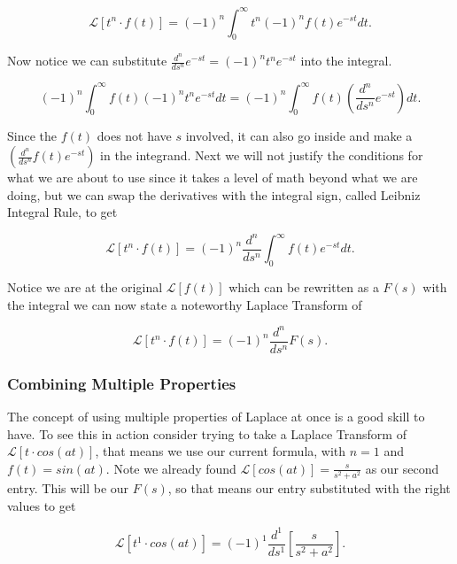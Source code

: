 \documentclass[12pt]{article}
\newcommand{\lp}{\mathscr{L}}
\begin{document}
\begin{equation*}
    \lp[t^n \cdot f(t)]=(-1)^n \int_0^{\infty} t^n (-1)^nf(t) e^{-st} dt.
\end{equation*}

Now notice we can substitute $\frac{d^n}{ds^n}e^{-st}=(-1)^n t^n e^{-st}$ into the integral. 

\begin{equation*}
    (-1)^n \int_0^{\infty} f(t)(-1)^nt^n e^{-st} dt=(-1)^n \int_0^{\infty} f(t) \left(\frac{d^n}{ds^n}e^{-st}\right) dt.
\end{equation*}

Since the $f(t)$ does not have $s$ involved, it can also go inside and make a $ \left(\frac{d^n}{ds^n}f(t)e^{-st}\right)$ in the integrand. Next we will not justify the conditions for what we are about to use since it takes a level of math beyond what we are doing, but we can swap the derivatives with the integral sign, called Leibniz Integral Rule, to get

\begin{equation*}
    \lp[t^n \cdot f(t)]=(-1)^n \frac{d^n}{ds^n}\int_0^{\infty} f(t) e^{-st} dt.
\end{equation*}

Notice we are at the original $\lp[f(t)]$ which can be rewritten as a $F(s)$ with the integral we can now state a noteworthy Laplace Transform of

\begin{equation*}
    \lp[t^n \cdot f(t)]=(-1)^n \frac{d^n}{ds^n}F(s).
\end{equation*}

\subsubsection{Combining Multiple Properties}

The concept of using multiple properties of Laplace at once is a good skill to have. To see this in action consider trying to take a Laplace Transform of $\lp[t\cdot cos(at)]$, that means we use our current formula, with $n=1$ and $f(t)=sin(at)$. Note we already found $\lp[cos(at)]=\frac{s}{s^2+a^2}$ as our second entry. This will be our $F(s)$, so that means our entry substituted with the right values to get

\begin{equation*}
    \lp[t^1 \cdot cos(at)]=(-1)^1 \frac{d^1}{ds^1}\left[ \frac{s}{s^2+a^2} \right].
\end{equation*}
\end{document}

